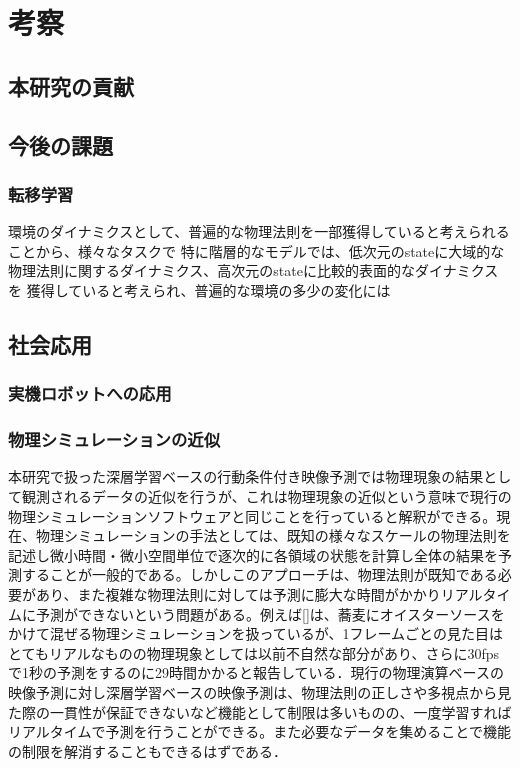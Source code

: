 \chapter{考察}
\label{chap:discussion}

\section{本研究の貢献}

\section{今後の課題}
\subsection{転移学習}
環境のダイナミクスとして、普遍的な物理法則を一部獲得していると考えられることから、様々なタスクで
特に階層的なモデルでは、低次元のstateに大域的な物理法則に関するダイナミクス、高次元のstateに比較的表面的なダイナミクスを
獲得していると考えられ、普遍的な環境の多少の変化には

\section{社会応用}
\subsection{実機ロボットへの応用}

\subsection{物理シミュレーションの近似}
本研究で扱った深層学習ベースの行動条件付き映像予測では物理現象の結果として観測されるデータの近似を行うが、これは物理現象の近似という意味で現行の物理シミュレーションソフトウェアと同じことを行っていると解釈ができる。現在、物理シミュレーションの手法としては、既知の様々なスケールの物理法則を記述し微小時間・微小空間単位で逐次的に各領域の状態を計算し全体の結果を予測することが一般的である。しかしこのアプローチは、物理法則が既知である必要があり、また複雑な物理法則に対しては予測に膨大な時間がかかりリアルタイムに予測ができないという問題がある。例えば[]は、蕎麦にオイスターソースをかけて混ぜる物理シミュレーションを扱っているが、1フレームごとの見た目はとてもリアルなものの物理現象としては以前不自然な部分があり、さらに30fpsで1秒の予測をするのに29時間かかると報告している．現行の物理演算ベースの映像予測に対し深層学習ベースの映像予測は、物理法則の正しさや多視点から見た際の一貫性が保証できないなど機能として制限は多いものの、一度学習すればリアルタイムで予測を行うことができる。また必要なデータを集めることで機能の制限を解消することもできるはずである．

